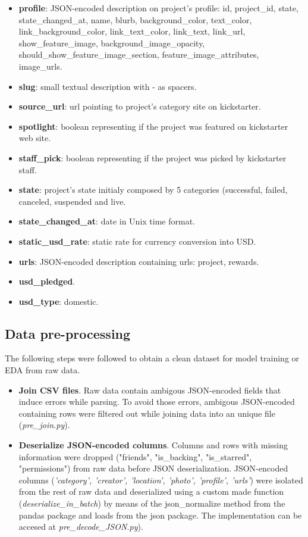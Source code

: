 \documentclass{article}
\begin{document}
{\begin{itemize}
    \item \textbf{profile}: JSON-encoded description on project's profile: id, project\_id, state, state\_changed\_at, name, blurb, background\_color, text\_color, link\_background\_color, link\_text\_color, link\_text, link\_url, show\_feature\_image, background\_image\_opacity, should\_show\_feature\_image\_section, feature\_image\_attributes, image\_urls. 
    \item \textbf{slug}: small textual description with - as spacers.
    \item \textbf{source\_url}: url pointing to project's category site on kickstarter.
    \item \textbf{spotlight}: boolean representing if the project was featured on kickstarter web site.
    \item \textbf{staff\_pick}: boolean representing if the project was picked by kickstarter staff.
    \item \textbf{state}: project's state initialy composed by 5 categories (successful, failed, canceled, suspended and live.
    \item \textbf{state\_changed\_at}: date in Unix time format.
    \item \textbf{static\_usd\_rate}: static rate for currency conversion into USD.
    \item \textbf{urls}: JSON-encoded description containing urls: project, rewards.
    \item \textbf{usd\_pledged}.
    \item \textbf{usd\_type}: domestic.
\end{itemize} 

\subsection{Data pre-processing}
\label{subsec:data_prepro}
The following steps were followed to obtain a clean dataset for model training or EDA from raw data.
\begin{itemize}
    \item \textbf{Join CSV files}.
Raw data contain ambigous JSON-encoded fields that induce errors while parsing. To avoid those errors, ambigous JSON-encoded containing rows were filtered out while joining data into an unique file (\emph{pre\_join.py}).

    \item \textbf{Deserialize JSON-encoded columns}.
Columns and rows with missing information were dropped ("friends", "is\_backing", "is\_starred", "permissions") from raw data before JSON deserialization.
JSON-encoded columns (\emph{'category', 'creator', 'location', 'photo', 'profile', 'urls'}) were isolated from the rest of raw data and deserialized using a custom made function (\emph{deserialize\_in\_batch}) by means of the json\_normalize method from the pandas package and loads from the json package. The implementation can be accesed at \emph{pre\_decode\_JSON.py}).


\end{itemize}}
\end{document}

